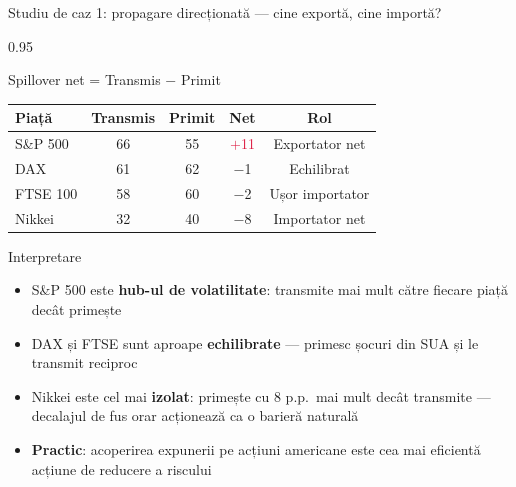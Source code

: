 \documentclass[9pt, aspectratio=169, t]{beamer}
\begin{document}
\begin{frame}{Studiu de caz 1: propagare direcționată --- cine exportă, cine importă?}
    \begin{cminipage}{0.95\textwidth}
    {\footnotesize
    \begin{block}{Spillover net = Transmis $-$ Primit}
        \vspace{0.1cm}
        {\small
        \begin{center}
        \begin{tabular}{l|ccc|c}
            \hline
            \textbf{Piață} & \textbf{Transmis} & \textbf{Primit} & \textbf{Net} & \textbf{Rol} \\
            \hline
            S\&P 500  & 66 & 55 & \textcolor{Crimson}{$+$11} & Exportator net \\
            DAX       & 61 & 62 & \textcolor{MainBlue}{$-$1} & Echilibrat \\
            FTSE 100  & 58 & 60 & \textcolor{MainBlue}{$-$2} & Ușor importator \\
            Nikkei    & 32 & 40 & \textcolor{MainBlue}{$-$8} & Importator net \\
            \hline
        \end{tabular}
        \end{center}
        }
    \end{block}
    \begin{alertblock}{Interpretare}
        \begin{itemize}\setlength{\itemsep}{0pt}
            \item S\&P 500 este \textbf{hub-ul de volatilitate}: transmite mai mult către fiecare piață decât primește
            \item DAX și FTSE sunt aproape \textbf{echilibrate} --- primesc șocuri din SUA și le transmit reciproc
            \item Nikkei este cel mai \textbf{izolat}: primește cu 8 p.p.\ mai mult decât transmite --- decalajul de fus orar acționează ca o barieră naturală
            \item \textbf{Practic}: acoperirea expunerii pe acțiuni americane este cea mai eficientă acțiune de reducere a riscului
        \end{itemize}
    \end{alertblock}
    }
    \end{cminipage}
\end{frame}
\end{document}
